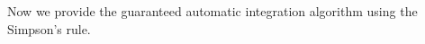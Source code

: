 \documentclass{iitthesis}
\theoremstyle{definition}
\theoremstyle{remark}
\begin{document}
%
%
%
Now we provide the guaranteed automatic integration algorithm using the Simpson's rule.
\end{document}
